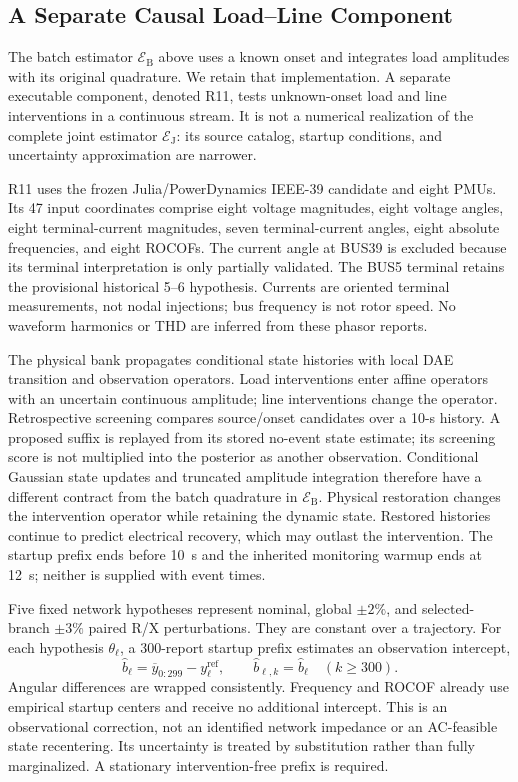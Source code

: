 \subsection{A Separate Causal Load--Line Component}
\label{sec:continuous-component}

The batch estimator $\mathcal E_{\mathrm B}$ above uses a known onset and integrates load amplitudes with its original quadrature. We retain that implementation. A separate executable component, denoted R11, tests unknown-onset load and line interventions in a continuous stream. It is not a numerical realization of the complete joint estimator $\mathcal E_{\mathrm J}$: its source catalog, startup conditions, and uncertainty approximation are narrower.

R11 uses the frozen Julia/PowerDynamics IEEE-39 candidate and eight PMUs. Its 47 input coordinates comprise eight voltage magnitudes, eight voltage angles, eight terminal-current magnitudes, seven terminal-current angles, eight absolute frequencies, and eight ROCOFs. The current angle at BUS39 is excluded because its terminal interpretation is only partially validated. The BUS5 terminal retains the provisional historical 5--6 hypothesis. Currents are oriented terminal measurements, not nodal injections; bus frequency is not rotor speed. No waveform harmonics or THD are inferred from these phasor reports.

The physical bank propagates conditional state histories with local DAE transition and observation operators. Load interventions enter affine operators with an uncertain continuous amplitude; line interventions change the operator. Retrospective screening compares source/onset candidates over a 10-s history. A proposed suffix is replayed from its stored no-event state estimate; its screening score is not multiplied into the posterior as another observation. Conditional Gaussian state updates and truncated amplitude integration therefore have a different contract from the batch quadrature in $\mathcal E_{\mathrm B}$. Physical restoration changes the intervention operator while retaining the dynamic state. Restored histories continue to predict electrical recovery, which may outlast the intervention. The startup prefix ends before 10~s and the inherited monitoring warmup ends at 12~s; neither is supplied with event times.

Five fixed network hypotheses represent nominal, global $\pm2\%$, and selected-branch $\pm3\%$ paired R/X perturbations. They are constant over a trajectory. For each hypothesis $\theta_\ell$, a 300-report startup prefix estimates an observation intercept,
\begin{equation}
 \widehat b_\ell=\overline y_{0:299}-y^{\mathrm{ref}}_\ell,
 \qquad \widehat b_{\ell,k}=\widehat b_\ell\quad(k\geq300).
 \label{eq:continuous-intercept}
\end{equation}
Angular differences are wrapped consistently. Frequency and ROCOF already use empirical startup centers and receive no additional intercept. This is an observational correction, not an identified network impedance or an AC-feasible state recentering. Its uncertainty is treated by substitution rather than fully marginalized. A stationary intervention-free prefix is required.

